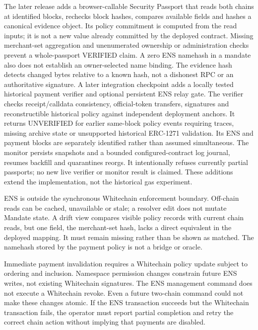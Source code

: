 \documentclass[11pt]{article}
\begin{document}
The later release adds a browser-callable Security Passport that reads both chains at identified blocks, rechecks block hashes, compares available fields and hashes a canonical evidence object. Its policy commitment is computed from the read inputs; it is not a new value already committed by the deployed contract. Missing merchant-set aggregation and unenumerated ownership or administration checks prevent a whole-passport VERIFIED claim. A zero ENS namehash in a mandate also does not establish an owner-selected name binding. The evidence hash detects changed bytes relative to a known hash, not a dishonest RPC or an authoritative signature. A later integration checkpoint adds a locally tested historical payment verifier and optional persistent ENS relay gate. The verifier checks receipt/calldata consistency, official-token transfers, signatures and reconstructible historical policy against independent deployment anchors. It returns UNVERIFIED for earlier same-block policy events requiring traces, missing archive state or unsupported historical ERC-1271 validation. Its ENS and payment blocks are separately identified rather than assumed simultaneous. The monitor persists snapshots and a bounded configured-contract log journal, resumes backfill and quarantines reorgs. It intentionally refuses currently partial passports; no new live verifier or monitor result is claimed. These additions extend the implementation, not the historical gas experiment.



ENS is outside the synchronous Whitechain enforcement boundary. Off-chain reads can be cached, unavailable or stale; a resolver edit does not mutate Mandate state. A drift view compares visible policy records with current chain reads, but one field, the merchant-set hash, lacks a direct equivalent in the deployed mapping. It must remain missing rather than be shown as matched. The namehash stored by the payment policy is not a bridge or oracle.

Immediate payment invalidation requires a Whitechain policy update subject to ordering and inclusion. Namespace permission changes constrain future ENS writes, not existing Whitechain signatures. The ENS management command does not execute a Whitechain revoke. Even a future two-chain command could not make these changes atomic. If the ENS transaction succeeds but the Whitechain transaction fails, the operator must report partial completion and retry the correct chain action without implying that payments are disabled.
\end{document}

